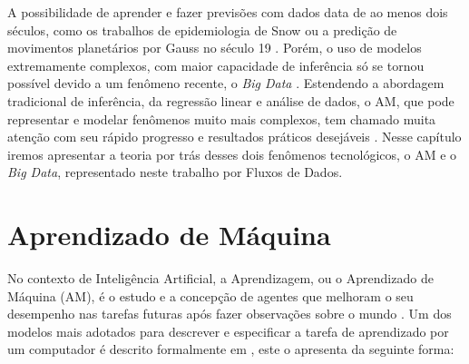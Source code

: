 \newcommand{\texCommand}[1]{\texttt{\textbackslash{#1}}}%

\newcommand{\exemplo}[1]{%
\vspace{\baselineskip}%
\noindent\fbox{\begin{minipage}{\textwidth}#1\end{minipage}}%
\\\vspace{\baselineskip}}%

\newcommand{\exemploVerbatim}[1]{%
\vspace{\baselineskip}%
\noindent\fbox{\begin{minipage}{\textwidth}%
#1\end{minipage}}%
\\\vspace{\baselineskip}}%
\label{chap:aprendizado}
A possibilidade de aprender e fazer previsões com dados data de ao menos dois séculos, como os trabalhos de epidemiologia de Snow ou a predição de movimentos planetários por Gauss no século 19 \cite{vinten2003cholera,stigler1986history,russell2016artificial}. Porém, o uso de modelos extremamente complexos, com maior capacidade de inferência só se tornou possível devido a um fenômeno recente, o \textit{Big Data} \cite{mcafee2012big,halevy2009unreasonable}.
Estendendo a abordagem tradicional de inferência, da regressão linear e análise de dados, o AM, que pode representar e modelar fenômenos muito mais complexos, tem chamado muita atenção com seu rápido progresso e resultados práticos desejáveis \cite{openai2019dota,gibney2016google}. Nesse capítulo iremos apresentar a teoria por trás desses dois fenômenos tecnológicos, o AM e o \textit{Big Data}, representado neste trabalho por Fluxos de Dados.


\section{Aprendizado de Máquina}
\label{sec:aprendizado-de-maquina}

No contexto de Inteligência Artificial, a Aprendizagem, ou o Aprendizado
de Máquina (AM), é o estudo e a concepção de agentes que melhoram o seu
desempenho nas tarefas futuras após fazer observações sobre o mundo
\cite{russell2016artificial, mohri2018foundations}. Um dos modelos mais adotados
para descrever e especificar a tarefa de aprendizado por um computador é
descrito formalmente em \cite{mitchell1997machine}, este o apresenta da seguinte
forma:

